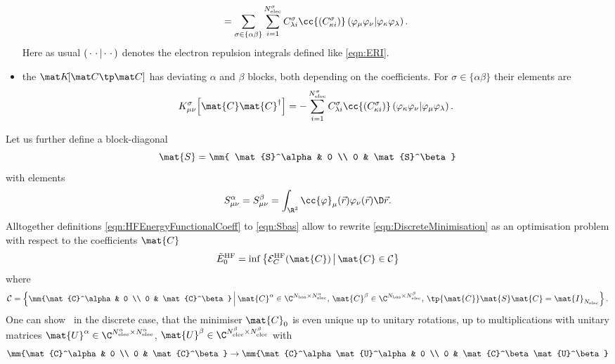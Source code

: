 \begin{rem}
\begin{itemize}
\begin{equation}
					= \sum_{\sigma\in\{\alpha\beta\}}
						\sum_{i=1}^{N_\text{elec}^\sigma}
						C^\sigma_{\lambda i}
						\cc{\left(C^\sigma_{\kappa i}\right)}
						\eriMu{\varphi_{\mu} \varphi_{\nu}}
							{\varphi_{\kappa} \varphi_{\lambda}}.
				\label{eqn:Jbas}
			\end{equation}
			Here as usual $\left( \,\cdot\, \,\cdot\, \middle| \,\cdot\, \,\cdot\, \right)$
			denotes the electron repulsion integrals defined like \eqref{eqn:ERI}.
		\item the  $\matKfull$ has
			deviating $\alpha$ and $\beta$ blocks,
			both depending on the coefficients.
			For $\sigma \in \{\alpha\beta\}$ their elements are
			\begin{equation}
				K_{\mu\nu}^\sigma\!\left[\mat{C}\mat{C}^\dagger\right]
					= - \sum_{i=1}^{N_\text{elec}^\sigma}
						C^\sigma_{\lambda i}
						\cc{\left(C^\sigma_{\kappa i}\right)}
						\eriMu{\varphi_{\kappa} \varphi_{\nu}}
							{\varphi_{\mu} \varphi_{\lambda}}.
				\label{eqn:Kbas}
			\end{equation}
	\end{itemize}
	Let us further define a block-diagonal 
	\[ \mat{S} = \mm{ \mat{S}^\alpha & 0 \\ 0 & \mat{S}^\beta} \]
	with elements
	\begin{equation}
		S^\alpha_{\mu\nu} = S^\beta_{\mu\nu} = \int_{\R^3} \cc{\varphi}_\mu(\vec{r})
			\varphi_{\nu}(\vec{r})\D\vec{r}.
		\label{eqn:Sbas}
	\end{equation}
	Alltogether definitions \eqref{eqn:HFEnergyFunctionalCoeff}
	to \eqref{eqn:Sbas} allow to rewrite \eqref{eqn:DiscreteMinimisation}
	as an optimisation problem with respect to the coefficients $\mat{C}$
	\begin{equation}
		\tilde{E}_0^\text{HF} = \inf \left\{
			\Ehf_C(\mat{C}) \, \middle| \, \mat{C} \in \mathcal{C}
		\right\}
		\label{eqn:HFOptCoeff}
	\end{equation}
	where
	\begin{equation}
		\mathcal{C} = \left\{
			\mm{\mat{C}^\alpha & 0 \\ 0 & \mat{C}^\beta}
			\, \middle| \,
			\mat{C}^\alpha \in \C^{\Nbas\times\NelecA}, \,
			\mat{C}^\beta \in \C^{\Nbas\times\NelecB}, \,
			\tp{\mat{C}} \mat{S} \mat{C} = \mat{I}_{\Nelec}
			\right\}.
		\label{eqn:HFStiefel}
	\end{equation}
	One can show~\cite{Cances2000} in the discrete case,
	that the minimiser $\mat{C}_0$ is even unique
	up to unitary rotations, \ie up to multiplications with unitary matrices
	$\mat{U}^\alpha \in \C^{\NelecA\times\NelecA}$,
	$\mat{U}^\beta \in \C^{\NelecB\times\NelecB}$ with
	\[ \mm{\mat{C}^\alpha & 0 \\ 0 & \mat{C}^\beta}
		\to \mm{\mat{C}^\alpha\mat{U}^\alpha & 0 \\ 0 & \mat{C}^\beta\mat{U}^\beta} \]


\end{rem}
